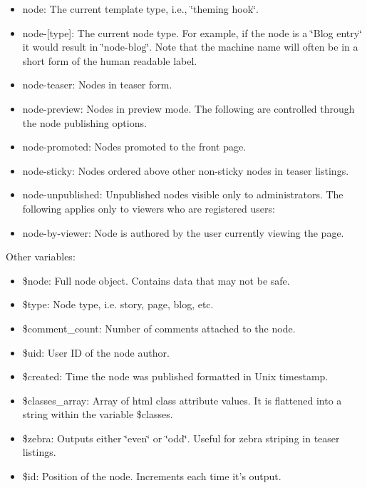 \begin{itemize}
\begin{itemize}
\item node: The current template type, i.e., \char`\"{}theming hook\char`\"{}.\item node-\mbox{[}type\mbox{]}: The current node type. For example, if the node is a \char`\"{}Blog entry\char`\"{} it would result in \char`\"{}node-blog\char`\"{}. Note that the machine name will often be in a short form of the human readable label.\item node-teaser: Nodes in teaser form.\item node-preview: Nodes in preview mode. The following are controlled through the node publishing options.\item node-promoted: Nodes promoted to the front page.\item node-sticky: Nodes ordered above other non-sticky nodes in teaser listings.\item node-unpublished: Unpublished nodes visible only to administrators. The following applies only to viewers who are registered users:\item node-by-viewer: Node is authored by the user currently viewing the page.\end{itemize}
\end{itemize}


Other variables:\begin{itemize}
\item \$node: Full node object. Contains data that may not be safe.\item \$type: Node type, i.e. story, page, blog, etc.\item \$comment\_\-count: Number of comments attached to the node.\item \$uid: User ID of the node author.\item \$created: Time the node was published formatted in Unix timestamp.\item \$classes\_\-array: Array of html class attribute values. It is flattened into a string within the variable \$classes.\item \$zebra: Outputs either \char`\"{}even\char`\"{} or \char`\"{}odd\char`\"{}. Useful for zebra striping in teaser listings.\item \$id: Position of the node. Increments each time it's output.\end{itemize}


